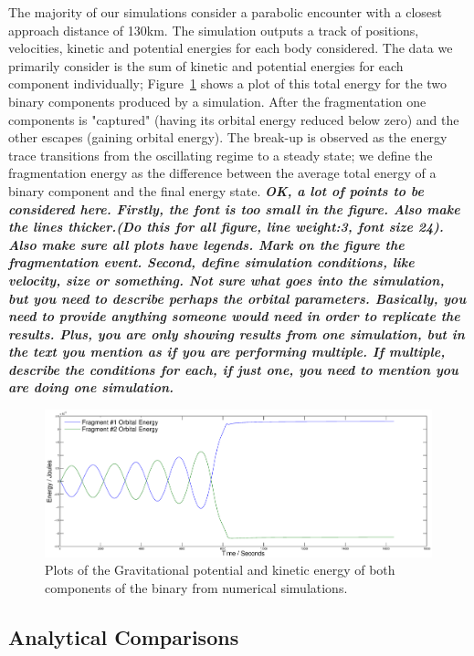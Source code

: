 \documentclass[letterpaper, preprint, paper,11pt]{AAS}	%
\begin{document}
The majority of our simulations consider a parabolic encounter with a closest approach distance of 130km. The simulation outputs a track of positions, velocities, kinetic and potential energies for each body considered. The data we primarily consider is the sum of kinetic and potential energies for each component individually;  Figure~\ref{fig:Num} shows a plot of this total energy for the two binary components produced by a simulation. After the fragmentation one components is "captured" (having its orbital energy reduced below zero) and the other escapes (gaining orbital energy). The break-up is observed as the energy trace transitions from the oscillating regime to a steady state; we define the fragmentation energy as the difference between the average total energy of a binary component and the final energy state. \textbf{\emph{OK, a lot of points to be considered here. Firstly, the font is too small in the figure. Also make the lines thicker.(Do this for all figure, line weight:3, font size 24). Also make sure all plots have legends. Mark on the figure the fragmentation event. Second, define simulation conditions, like velocity, size or something. Not sure what goes into the simulation, but you need to describe perhaps the orbital parameters. Basically, you need to provide anything someone would need in order to replicate the results. Plus, you are only showing results from one simulation, but in the text you mention as if you are performing multiple. If multiple, describe the conditions for each, if just one, you need to mention you are doing one simulation.}}
\begin{figure}[H]
\centering
\centerline{\includegraphics[width=1.2\textwidth]{binary_num.eps}} 
\caption{Plots of the Gravitational potential and kinetic energy of both components of the binary from numerical simulations.} 
\label{fig:Num}
\end{figure}
 

\subsection{Analytical Comparisons}
\end{document}
